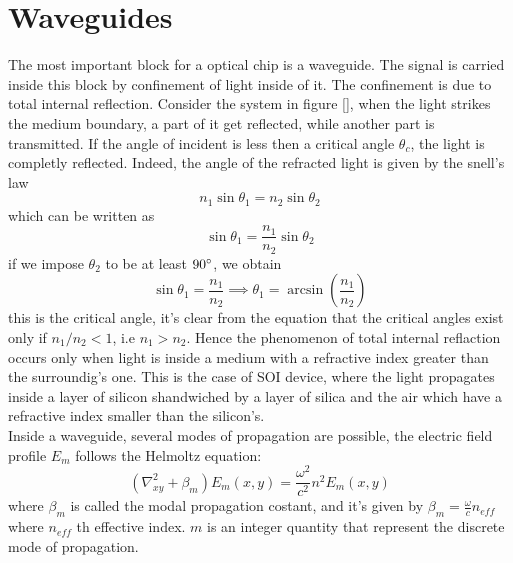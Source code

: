 \documentclass[10pt]{book}
\begin{document}
\section{Waveguides}
The most important block for a optical chip is a waveguide. The signal is carried inside this block by confinement of light inside of it. The confinement is due to total internal reflection. Consider the system in figure [], when the light strikes the medium boundary, a part of it get reflected, while another part is transmitted. If the angle of incident is less then a critical angle $\theta_c$, the light is completly reflected. Indeed, the angle of the refracted light is given by the snell's law
\[n_1 \sin \theta_1 = n_2 \sin \theta_2\]
which can be written as
\[\sin \theta_1 = \frac{n_1}{n_2}\sin \theta_2\]
if we impose $\theta_2$ to be at least $90\degree$, we obtain
\[\sin \theta_1 = \frac{n_1}{n_2} \implies \theta_1 = \arcsin\left(\frac{n_1}{n_2}\right) \]
this is the critical angle, it's clear from the equation that the critical angles exist only if $n_1/n_2<1$, i.e $n_1>n_2$. Hence the phenomenon of total internal reflaction occurs only when light is inside a medium with a refractive index greater than the surroundig's one. This is the case of SOI device, where the light propagates inside a layer of silicon shandwiched by a layer of silica and the air which have a refractive index smaller than the silicon's.\\
Inside a waveguide, several modes of propagation are possible, the electric field profile $E_m$ follows the Helmoltz equation:
\[(\nabla_{xy}^2 + \beta_m)E_m(x,y)= \frac{\omega^2}{c^2}n^2E_m(x,y)\]
where $\beta_m$ is called the modal propagation costant, and it's given by $\beta_m = \frac{\omega}{c}n_{eff}$ where $n_{eff}$ th effective index. $m$ is an integer quantity that represent the discrete mode of propagation.
\end{document}
